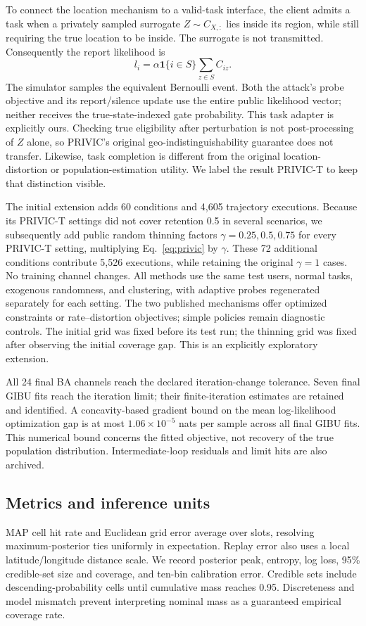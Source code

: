 \documentclass[3p,times]{elsarticle}
\newcommand{\ind}{\mathbf{1}}
\begin{document}
To connect the location mechanism to a valid-task interface, the client admits a task when a privately sampled surrogate $Z\sim C_{X,:}$ lies inside its region, while still requiring the true location to be inside. The surrogate is not transmitted. Consequently the report likelihood is
\begin{equation}
 l_i=\alpha\ind\{i\in S\}\sum_{z\in S}C_{iz}.
\label{eq:privic}
\end{equation}
The simulator samples the equivalent Bernoulli event. Both the attack's probe objective and its report/silence update use the entire public likelihood vector; neither receives the true-state-indexed gate probability. This task adapter is explicitly ours. Checking true eligibility after perturbation is not post-processing of $Z$ alone, so PRIVIC's original geo-indistinguishability guarantee does not transfer. Likewise, task completion is different from the original location-distortion or population-estimation utility. We label the result PRIVIC-T to keep that distinction visible.

The initial extension adds 60 conditions and 4,605 trajectory executions. Because its PRIVIC-T settings did not cover retention 0.5 in several scenarios, we subsequently add public random thinning factors $\gamma=0.25,0.5,0.75$ for every PRIVIC-T setting, multiplying Eq.~\eqref{eq:privic} by $\gamma$. These 72 additional conditions contribute 5,526 executions, while retaining the original $\gamma=1$ cases. No training channel changes. All methods use the same test users, normal tasks, exogenous randomness, and clustering, with adaptive probes regenerated separately for each setting. The two published mechanisms offer optimized constraints or rate--distortion objectives; simple policies remain diagnostic controls. The initial grid was fixed before its test run; the thinning grid was fixed after observing the initial coverage gap. This is an explicitly exploratory extension.

All 24 final BA channels reach the declared iteration-change tolerance. Seven final GIBU fits reach the iteration limit; their finite-iteration estimates are retained and identified. A concavity-based gradient bound on the mean log-likelihood optimization gap is at most $1.06\times10^{-5}$ nats per sample across all final GIBU fits. This numerical bound concerns the fitted objective, not recovery of the true population distribution. Intermediate-loop residuals and limit hits are also archived.

\subsection{Metrics and inference units}
MAP cell hit rate and Euclidean grid error average over slots, resolving maximum-posterior ties uniformly in expectation. Replay error also uses a local latitude/longitude distance scale. We record posterior peak, entropy, log loss, 95\% credible-set size and coverage, and ten-bin calibration error. Credible sets include descending-probability cells until cumulative mass reaches 0.95. Discreteness and model mismatch prevent interpreting nominal mass as a guaranteed empirical coverage rate.
\end{document}
